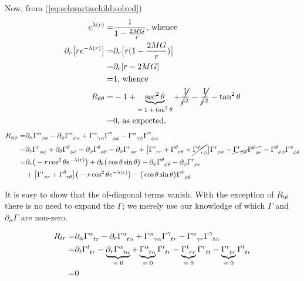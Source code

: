 \documentclass[]{article}
\begin{document}
 Now, from (\ref{eq:schwartzschild:solved})
\begin{align*}
	e^{\lambda(r)} =& \frac{1}{1 - \frac{2MG}{r}} \text{, whence}\\
	\partial_r \big[r  e^{-\lambda(r)}\big] =& \partial_r \big[r(1 - \frac{2MG}{r})\big]\\
	=& \partial_r [r-2MG]\\
	=& 1 \text{, whence}\\
	R_{\theta\theta} =& - 1 + \underbrace{\sec^2 \theta}_\text{$=1+\tan^2 \theta$} + \cancel{\frac{1}{r^2}} -\cancel{\frac{1}{r^2}} - \tan^2 \theta \\
	=& 0 \text{, as expected.}
\end{align*}
\begin{align*}
	R_{\phi\phi} =& \partial_\alpha \Gamma\indices{^\alpha_{\phi\phi}} - \partial_\phi \Gamma\indices{^\alpha_{\phi\alpha}} + \Gamma\indices{^\alpha_{\gamma\alpha}} \Gamma\indices{^\gamma_{\phi\phi}} - \Gamma\indices{^\alpha_{\gamma\phi}} \Gamma\indices{^\gamma_{\phi\alpha}}\\
	 =& \partial_r \Gamma\indices{^r_{\phi\phi}} + \partial_\theta \Gamma\indices{^\theta_{\phi\phi}} - \partial_\phi \Gamma\indices{^\theta_{\phi\theta}} - \partial_\phi \Gamma\indices{^r_{\phi r}} + \big[\Gamma\indices{^r_{rr}} + \Gamma\indices{^\theta_{r\theta}}+\cancel{\Gamma\indices{^\phi_{r\phi}}}\big] \Gamma\indices{^r_{\phi\phi}} - \cancel{\Gamma\indices{^r_{\phi\phi}} \Gamma\indices{^\phi_{\phi r}}} - \Gamma\indices{^\theta_{\phi\phi}} \Gamma\indices{^\phi_{\phi\theta}}\\
	  =& \partial_r \big(-r \cos^2 \theta e^{-\lambda(r)} \big) + \partial_\theta \big(\cos \theta \sin \theta \big) - \partial_\phi \Gamma\indices{^\theta_{\phi\theta}} - \partial_\phi \Gamma\indices{^r_{\phi r}}\\ &+ \big[\Gamma\indices{^r_{rr}} + \Gamma\indices{^\theta_{r\theta}}\big] \big(-r \cos^2 \theta e^{-\lambda(r)} \big)  - \big(\cos \theta \sin \theta \big) \Gamma\indices{^\phi_{\phi\theta}}
\end{align*}

It is easy to show that the of-diagonal terms vanish. With the exception of $R_{t\theta}$ there is no need to expand the $\Gamma$; we merely use our knowledge of which $\Gamma$ and $\partial_\alpha \Gamma$ are non-zero.

\begin{align*}
	R_{tr} =& \partial_\alpha \Gamma\indices{^\alpha_{tr}} - \partial_r \Gamma\indices{^\alpha_{t\alpha}} + \Gamma\indices{^\alpha_{\gamma\alpha}} \Gamma\indices{^\gamma_{tr}} - \Gamma\indices{^\alpha_{\gamma r}} \Gamma\indices{^\gamma_{t\alpha}}\\
	=&\partial_t \Gamma\indices{^t_{tr}} - \underbrace{\partial_r \Gamma\indices{^\alpha_{t\alpha}}}_\text{$=0$} + \underbrace{\Gamma\indices{^\alpha_{t\alpha}}}_\text{$=0$} \Gamma\indices{^t_{tr}} - \underbrace{\Gamma\indices{^t_{r r}}}_\text{$=0$} \Gamma\indices{^r_{tt}} -\underbrace{ \Gamma\indices{^r_{t r}}}_\text{$=0$} \Gamma\indices{^t_{tr}}\\
	=&0
\end{align*}
\end{document}
